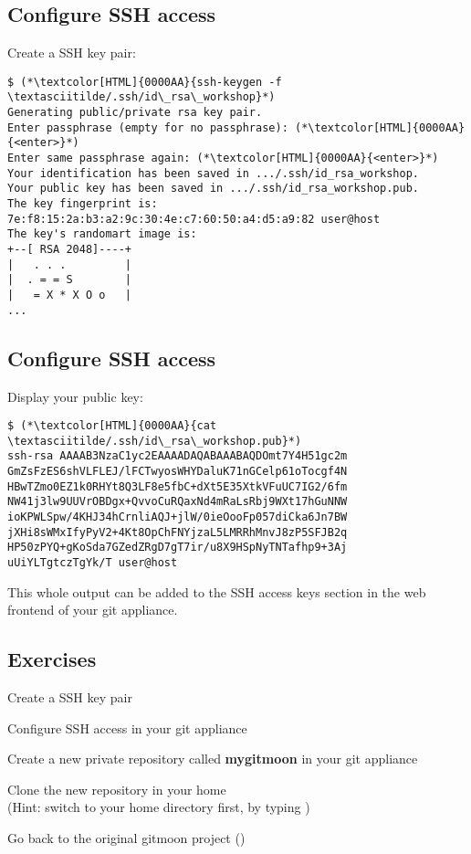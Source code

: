 \subsection{Configure SSH access}
\begin{frame}[fragile]
  \subslidetitle
  Create a SSH key pair:
  \begin{lstlisting}
$ (*\textcolor[HTML]{0000AA}{ssh-keygen -f \textasciitilde/.ssh/id\_rsa\_workshop}*)
Generating public/private rsa key pair.
Enter passphrase (empty for no passphrase): (*\textcolor[HTML]{0000AA}{<enter>}*)
Enter same passphrase again: (*\textcolor[HTML]{0000AA}{<enter>}*)
Your identification has been saved in .../.ssh/id_rsa_workshop.
Your public key has been saved in .../.ssh/id_rsa_workshop.pub.
The key fingerprint is:
7e:f8:15:2a:b3:a2:9c:30:4e:c7:60:50:a4:d5:a9:82 user@host
The key's randomart image is:
+--[ RSA 2048]----+
|   . . .         |
|  . = = S        |
|   = X * X O o   |
...
\end{lstlisting}
\end{frame}

\subsection{Configure SSH access}
\begin{frame}[fragile]
  \subslidetitle
  Display your public key:
  \begin{lstlisting}
$ (*\textcolor[HTML]{0000AA}{cat \textasciitilde/.ssh/id\_rsa\_workshop.pub}*)
ssh-rsa AAAAB3NzaC1yc2EAAAADAQABAAABAQDOmt7Y4H51gc2m
GmZsFzES6shVLFLEJ/lFCTwyosWHYDaluK71nGCelp61oTocgf4N
HBwTZmo0EZ1k0RHYt8Q3LF8e5fbC+dXt5E35XtkVFuUC7IG2/6fm
NW41j3lw9UUVrOBDgx+QvvoCuRQaxNd4mRaLsRbj9WXt17hGuNNW
ioKPWLSpw/4KHJ34hCrnliAQJ+jlW/0ieOooFp057diCka6Jn7BW
jXHi8sWMxIfyPyV2+4Kt8OpChFNYjzaL5LMRRhMnvJ8zP5SFJB2q
HP50zPYQ+gKoSda7GZedZRgD7gT7ir/u8X9HSpNyTNTafhp9+3Aj
uUiYLTgtczTgYk/T user@host
\end{lstlisting}

  This whole output can be added to the SSH access keys
  section in the web frontend of your git appliance.
\end{frame}

\subsection{Exercises}
\begin{frame}[fragile]
  \subslidetitle
  \begin{exercise}
    \item Create a SSH key pair
    \item Configure SSH access in your git appliance
    \item Create a new private repository called \textbf{mygitmoon} in your git appliance
    \item Clone the new repository in your home \\
      (Hint: switch to your home directory first, by typing )
    \item Go back to the original gitmoon project ()
  \end{exercise}
\end{frame}

